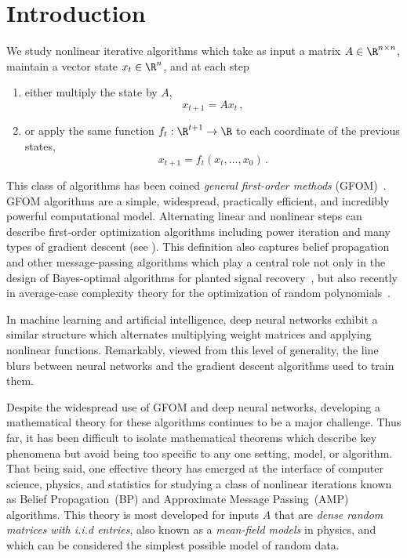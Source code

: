 \documentclass[12pt]{article}
\begin{document}
\section{Introduction}

We study nonlinear iterative algorithms which take as input a matrix $A\in\R^{n\times n}$, maintain a vector state $x_t\in\R^n$, and at each step
\begin{enumerate}
    \item either multiply the state by $A$, 
    \[x_{t+1} = Ax_t\,,\]
    \item or apply the same function $f_t:\R^{t+1}\to\R$ to each coordinate of the previous states,
    \[x_{t+1}=f_t(x_t, \dots, x_0)\,.\] 
\end{enumerate}
This class of algorithms has been coined \emph{general first-order methods} (GFOM)~\cite{celentano2020estimation, montanari2022statistically}.
GFOM algorithms are a simple, widespread, practically efficient, and incredibly powerful computational model.
Alternating linear and nonlinear steps can describe first-order optimization algorithms including power iteration and many types 
of gradient descent (see \cite{celentano2020estimation, gerbelot2022rigorous}).
This definition also captures belief propagation and other message-passing algorithms which play a central role not only in the design of Bayes-optimal algorithms for planted signal recovery~\cite{feng2022unifying}, but also recently in average-case complexity theory for the optimization of random polynomials~\cite{surveyOptimizingSpinGlass}.

In machine learning and artificial intelligence, deep neural networks exhibit a similar structure which alternates multiplying weight matrices and applying nonlinear functions.
Remarkably, viewed from this level of generality, the line blurs between neural networks and the gradient descent algorithms used to train them.


Despite the widespread use of GFOM and deep neural networks,
developing a mathematical theory for these algorithms continues to be a major challenge.
Thus far, it has been difficult to isolate mathematical theorems which describe key phenomena but avoid being too specific to any one setting, model, or algorithm.
That being said, one effective theory has emerged
at the interface of computer science, physics, and statistics for
studying a class of
nonlinear iterations known as Belief Propagation~(BP) and Approximate Message Passing~(AMP) algorithms.
This theory is most developed for inputs $A$ that are \emph{dense random matrices with i.i.d entries}, also known as a \emph{mean-field models} in physics, and which can be considered the simplest possible model of random data.
\end{document}
